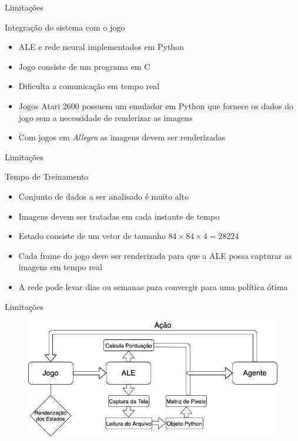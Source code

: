 \documentclass[aspectratio=169]{beamer}
\begin{document}
\begin{frame}{Limitações}
	\begin{block}{Integração do sistema com o jogo}
		\begin{itemize}
			\item ALE e rede neural implementados em Python
			\item Jogo consiste de um programa em C
			\item Dificulta a comunicação em tempo real
			\item Jogos Atari 2600 possuem um emulador em Python que fornece os dados do jogo sem a necessidade de renderizar as imagens \cite{brockman2016openai}
			\item Com jogos em \textit{Allegro} as imagens devem ser renderizadas
		\end{itemize}
	\end{block}
\end{frame}

\begin{frame}{Limitações}
	\begin{block}{Tempo de Treinamento}
		\begin{itemize}
			\item Conjunto de dados a ser analisado é muito alto
			\item Imagens devem ser tratadas em cada instante de tempo
			\item Estado consiste de um vetor de tamanho $84\times84\times4=28224$
			\item Cada frame do jogo deve ser renderizada para que a ALE possa capturar as imagens em tempo real
			\item A rede pode levar dias ou semanas para convergir para uma política ótima
		\end{itemize}
	\end{block}
\end{frame}

\begin{frame}{Limitações}
	\begin{figure}
		\centering
		\includegraphics[width=1 \textwidth]{imgs/processamento_imgs.png}
	\end{figure}
\end{frame}
\end{document}
